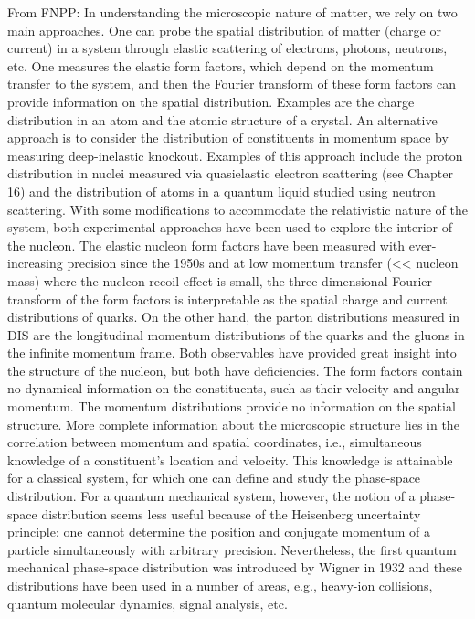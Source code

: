 From FNPP: 
In understanding the microscopic nature of matter, we rely on two main approaches. One can probe the spatial distribution of matter (charge or current) in a system through elastic scattering of electrons, photons, neutrons, etc. One measures the elastic form factors, which depend on the momentum transfer to the system, and then the Fourier transform of these form factors can provide information on the spatial distribution. Examples are the charge distribution in an atom and the atomic structure of a crystal. An alternative approach is to consider the distribution of constituents in momentum space by measuring deep-inelastic knockout. Examples of this approach include the proton distribution in nuclei measured via quasielastic electron scattering (see Chapter 16) and the distribution of atoms in a quantum liquid studied using neutron scattering. With some modifications to accommodate the relativistic nature of the system, both experimental approaches have been used to explore the interior of the nucleon. The elastic nucleon form factors have been measured with ever-increasing precision since the 1950s and at low momentum transfer (<< nucleon mass) where the nucleon recoil effect is small, the three-dimensional Fourier transform of the form factors is interpretable as the spatial charge and current distributions of quarks. On the other hand, the parton distributions measured in DIS are the longitudinal momentum distributions of the quarks and the gluons in the infinite momentum frame. Both observables have provided great insight into the structure of the nucleon, but both have deficiencies. The form factors contain no dynamical information on the constituents, such as their velocity and angular momentum. The momentum distributions provide no information on the spatial structure. More complete information about the microscopic structure lies in the correlation between momentum and spatial coordinates, i.e., simultaneous knowledge of a constituent's location and velocity. This knowledge is attainable for a classical system, for which one can define and study the phase-space distribution. For a quantum mechanical system, however, the notion of a phase-space distribution seems less useful because of the Heisenberg uncertainty principle: one cannot determine the position and conjugate momentum of a particle simultaneously with arbitrary precision. Nevertheless, the first quantum mechanical phase-space distribution was introduced by Wigner in 1932 and these distributions have been used in a number of areas, e.g., heavy-ion collisions, quantum molecular dynamics, signal analysis, etc.

